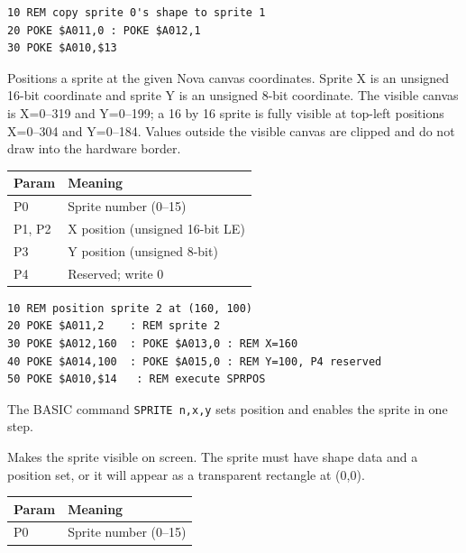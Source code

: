 \begin{lstlisting}
10 REM copy sprite 0's shape to sprite 1
20 POKE $A011,0 : POKE $A012,1
30 POKE $A010,$13
\end{lstlisting}



Positions a sprite at the given Nova canvas coordinates.  Sprite X is an
unsigned 16-bit coordinate and sprite Y is an unsigned 8-bit coordinate.
The visible canvas is X=0--319 and Y=0--199; a 16 by 16 sprite is fully visible
at top-left positions X=0--304 and Y=0--184.  Values outside the visible canvas
are clipped and do not draw into the hardware border.

\begin{center}
\small
\begin{tabular}{@{}ll@{}}
\toprule
\textbf{Param} & \textbf{Meaning} \\
\midrule
P0       & Sprite number (0--15) \\
P1, P2   & X position (unsigned 16-bit LE) \\
P3       & Y position (unsigned 8-bit) \\
P4       & Reserved; write 0 \\
\bottomrule
\end{tabular}
\end{center}

\begin{lstlisting}
10 REM position sprite 2 at (160, 100)
20 POKE $A011,2    : REM sprite 2
30 POKE $A012,160  : POKE $A013,0 : REM X=160
40 POKE $A014,100  : POKE $A015,0 : REM Y=100, P4 reserved
50 POKE $A010,$14   : REM execute SPRPOS
\end{lstlisting}

\begin{notebox}
The BASIC command \texttt{SPRITE n,x,y} sets position and enables the sprite
in one step.
\end{notebox}



Makes the sprite visible on screen.  The sprite must have shape data and a
position set, or it will appear as a transparent rectangle at (0,0).

\begin{center}
\small
\begin{tabular}{@{}ll@{}}
\toprule
\textbf{Param} & \textbf{Meaning} \\
\midrule
P0 & Sprite number (0--15) \\
\bottomrule
\end{tabular}
\end{center}

